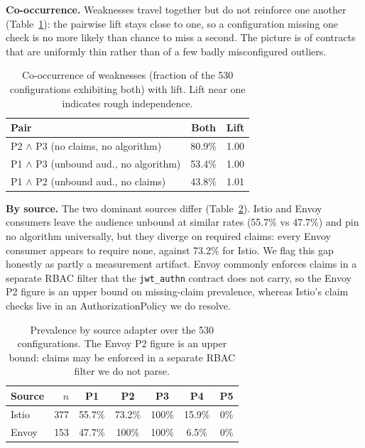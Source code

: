 \noindent\textbf{Co-occurrence.} Weaknesses travel together but do not reinforce one
another (Table~\ref{tab:cooccur}): the pairwise lift stays close to one, so a
configuration missing one check is no more likely than chance to miss a second. The
picture is of contracts that are uniformly thin rather than of a few badly
misconfigured outliers.

\begin{table}[t]
\centering\small
\caption{Co-occurrence of weaknesses (fraction of the 530 configurations exhibiting
both) with lift. Lift near one indicates rough independence.}
\label{tab:cooccur}
\begin{tabular}{@{}lcc@{}}
\toprule
Pair & Both & Lift \\
\midrule
P2 $\wedge$ P3 (no claims, no algorithm)      & 80.9\% & 1.00 \\
P1 $\wedge$ P3 (unbound aud., no algorithm)   & 53.4\% & 1.00 \\
P1 $\wedge$ P2 (unbound aud., no claims)      & 43.8\% & 1.01 \\
\bottomrule
\end{tabular}
\end{table}

\noindent\textbf{By source.} The two dominant sources differ
(Table~\ref{tab:bysource}). Istio and Envoy consumers leave the audience unbound at
similar rates (55.7\% vs 47.7\%) and pin no algorithm universally, but they diverge
on required claims: every Envoy consumer appears to require none, against 73.2\% for
Istio. We flag this gap honestly as partly a measurement artifact. Envoy commonly
enforces claims in a separate RBAC filter that the \texttt{jwt\_authn} contract does
not carry, so the Envoy P2 figure is an upper bound on missing-claim prevalence,
whereas Istio's claim checks live in an AuthorizationPolicy we do resolve.

\begin{table}[t]
\centering\small
\caption{Prevalence by source adapter over the 530 configurations. The Envoy P2
figure is an upper bound: claims may be enforced in a separate RBAC filter we do not
parse.}
\label{tab:bysource}
\begin{tabular}{@{}lrccccc@{}}
\toprule
Source & $n$ & P1 & P2 & P3 & P4 & P5 \\
\midrule
Istio & 377 & 55.7\% & 73.2\% & 100\% & 15.9\% & 0\% \\
Envoy & 153 & 47.7\% & 100\%  & 100\% & 6.5\%  & 0\% \\
\bottomrule
\end{tabular}
\end{table}

